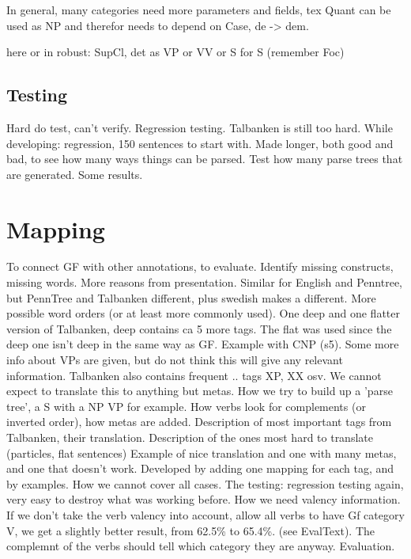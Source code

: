 \documentclass{report}
\begin{document}
In general, many categories need more parameters and fields, tex Quant can be used as NP
and therefor needs to depend on Case, de -> dem.

here or in robust: SupCl, det as VP or VV or S for S (remember Foc)

\subsection{Testing}
Hard do test, can't verify. Regression testing. Talbanken is still too hard.
While developing: regression, 150 sentences to start with. Made longer, both good and bad,
to see how many ways things can be parsed.
Test how many parse trees that are generated.
Some results.


\section{Mapping}
To connect GF with other annotations, to evaluate. Identify missing constructs,
missing words. More reasons from presentation.
Similar for English and Penntree, but PennTree and Talbanken different, plus swedish
makes a different. More possible word orders (or at least more commonly used).
One deep and one flatter version of Talbanken, deep contains ca 5 more tags.
The flat was used since the deep one
isn't deep in the same way as GF. Example with CNP (s5). Some
more info about VPs are given, but do not think this will give any relevant information.
Talbanken also contains frequent .. tags XP, XX osv. We cannot expect to translate
this to anything but metas.
How we try to build up a 'parse tree', a S with a NP VP for example. 
How verbs look for complements (or inverted order), how metas are added.
Description of most important tags from Talbanken, their translation.
Description of the ones most hard to translate (particles, flat sentences)
Example of nice translation and one with many metas, and one that doesn't work.
Developed by adding one mapping for each tag, and by examples.
How we cannot cover all cases. The testing: regression testing again,
very easy to destroy what was working before. 
How we need valency information.
If we don't take the verb valency into account, allow all verbs to have Gf category V,
we get a slightly better result,
from 62.5\% to 65.4\%.  (see EvalText). The complemnt of the verbs should tell which category
they are anyway.
Evaluation. 
\end{document}
